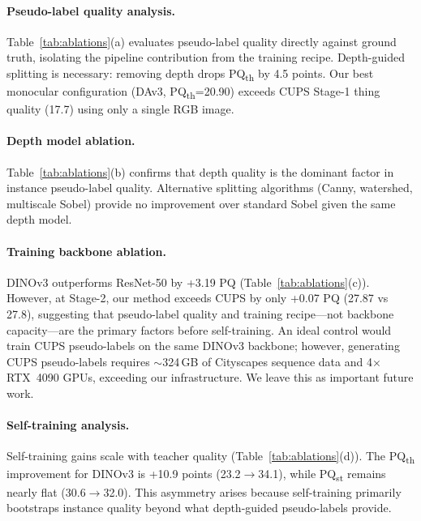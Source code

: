 \documentclass{bmvc2k}
\newcommand{\pqt}{PQ\textsubscript{th}\xspace}
\newcommand{\pqs}{PQ\textsubscript{st}\xspace}
\begin{document}
\paragraph{Pseudo-label quality analysis.}

Table~\ref{tab:ablations}(a) evaluates pseudo-label quality directly against ground truth, isolating the pipeline contribution from the training recipe. Depth-guided splitting is necessary: removing depth drops \pqt by 4.5 points. Our best monocular configuration (DAv3, \pqt=20.90) exceeds CUPS Stage-1 thing quality (17.7) using only a single RGB image.

\paragraph{Depth model ablation.}
\label{sec:depth_ablation}

Table~\ref{tab:ablations}(b) confirms that depth quality is the dominant factor in instance pseudo-label quality. Alternative splitting algorithms (Canny, watershed, multiscale Sobel) provide no improvement over standard Sobel given the same depth model.

\paragraph{Training backbone ablation.}

DINOv3 outperforms ResNet-50 by +3.19 PQ (Table~\ref{tab:ablations}(c)). However, at Stage-2, our method exceeds CUPS by only +0.07 PQ (27.87 vs 27.8), suggesting that pseudo-label quality and training recipe---not backbone capacity---are the primary factors before self-training. An ideal control would train CUPS pseudo-labels on the same DINOv3 backbone; however, generating CUPS pseudo-labels requires $\sim$324\,GB of Cityscapes sequence data and 4$\times$ RTX~4090 GPUs, exceeding our infrastructure. We leave this as important future work.

\paragraph{Self-training analysis.}

Self-training gains scale with teacher quality (Table~\ref{tab:ablations}(d)). The \pqt improvement for DINOv3 is +10.9 points (23.2$\to$34.1), while \pqs remains nearly flat (30.6$\to$32.0). This asymmetry arises because self-training primarily bootstraps instance quality beyond what depth-guided pseudo-labels provide.
\end{document}
